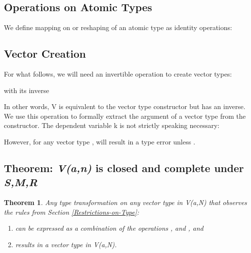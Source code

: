 \documentclass{article}
\newtheorem{theorem}{Theorem}
\begin{document}
\subsection{Operations on Atomic Types}

We define mapping on or reshaping of an atomic type as identity operations:








\subsection{Vector Creation}

For what follows, we will need an invertible operation  to create
vector types:



with its inverse



In other words, V is equivalent to the vector type constructor but
has an inverse. We use this operation to formally extract the argument
of a vector type from the constructor. The dependent variable k is
not strictly speaking necessary:



However, for any vector type ,  will result in
a type error unless . 


\subsection{Theorem: \emph{V(a,n)} is closed and complete under \emph{S,M,R}}

\begin{theorem}

Any type transformation on any vector type in \emph{V(a,N)} that observes
the rules from Section \ref{Restrictions-on-Type}:
\begin{enumerate}
\item can be expressed as a combination of the operations ,  and
, and 
\item results in a vector type in \emph{V(a,N).}
\end{enumerate}
\end{theorem}
\end{document}
